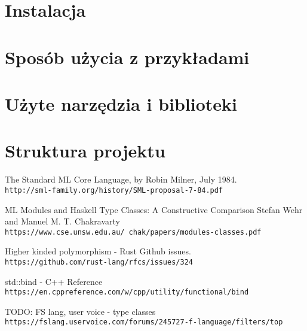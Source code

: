 \documentclass[declaration,shortabstract]{iithesis}
\begin{document}
\section{Instalacja}

\section{Sposób użycia z przykładami}

\section{Użyte narzędzia i biblioteki}

\section{Struktura projektu}


\begin{thebibliography}{1}

The Standard ML Core Language, by Robin Milner, July 1984.
\\\texttt{http://sml-family.org/history/SML-proposal-7-84.pdf}

ML Modules and Haskell Type Classes:
A Constructive Comparison
Stefan Wehr and Manuel M. T. Chakravarty
\\\texttt{https://www.cse.unsw.edu.au/~chak/papers/modules-classes.pdf}

Higher kinded polymorphism - Rust Github issues.
\\\texttt{https://github.com/rust-lang/rfcs/issues/324}

std::bind - C++ Reference
\\\texttt{https://en.cppreference.com/w/cpp/utility/functional/bind}

TODO: FS lang, user voice - type classes
\\\texttt{https://fslang.uservoice.com/forums/245727-f-language/filters/top}

\end{thebibliography}
\end{document}
